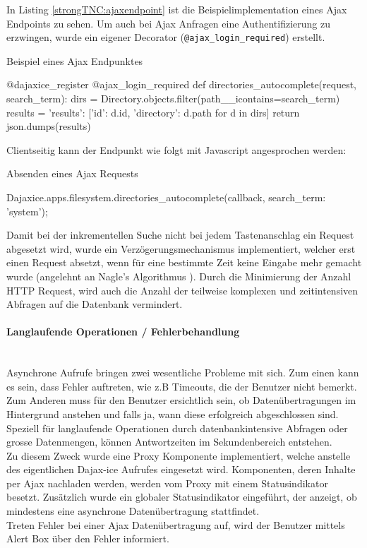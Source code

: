 In Listing \ref{strongTNC:ajaxendpoint} ist die Beispielimplementation eines Ajax Endpoints zu sehen. Um auch bei Ajax Anfragen eine Authentifizierung zu erzwingen, wurde ein eigener Decorator (\texttt{@ajax\_login\_required}) erstellt. 
\begin{listing}
\caption{Beispiel eines Ajax Endpunktes}
\label{strongTNC:ajaxendpoint}
\begin{pythoncode}
@dajaxice_register
@ajax_login_required
def directories_autocomplete(request, search_term):
    dirs = Directory.objects.filter(path__icontains=search_term)
    results = {'results': [{'id': d.id, 'directory': d.path} for d in dirs]}
    return json.dumps(results)
\end{pythoncode}
\end{listing}

Clientseitig kann der Endpunkt wie folgt mit Javascript angesprochen werden:
\begin{listing}
\caption{Absenden eines Ajax Requests}
\begin{jscode}
Dajaxice.apps.filesystem.directories_autocomplete(callback, {search_term: 'system'});
\end{jscode} 
\end{listing}

Damit bei der inkrementellen Suche nicht bei jedem Tastenanschlag ein Request
abgesetzt wird, wurde ein Verzögerungsmechanismus implementiert, welcher erst einen Request
absetzt, wenn für eine bestimmte Zeit keine Eingabe mehr gemacht wurde (angelehnt an Nagle's Algorithmus \cite{nagle1984congestion}).
Durch die Minimierung der Anzahl HTTP Request, wird auch die Anzahl der teilweise komplexen und zeitintensiven Abfragen auf die Datenbank vermindert.

\paragraph{Langlaufende Operationen / Fehlerbehandlung}\hspace{0pt}\\
Asynchrone Aufrufe bringen zwei wesentliche Probleme mit sich. Zum einen kann es
sein, dass Fehler auftreten, wie z.B Timeouts, die der Benutzer nicht bemerkt.
Zum Anderen muss für den Benutzer ersichtlich sein, ob Datenübertragungen im
Hintergrund anstehen und falls ja, wann diese erfolgreich abgeschlossen sind.
Speziell für langlaufende Operationen durch datenbankintensive Abfragen oder
grosse Datenmengen, können Antwortzeiten im Sekundenbereich entstehen. \\
Zu diesem Zweck wurde eine Proxy Komponente \cite{gamma1994design}
implementiert, welche anstelle des eigentlichen Dajax-ice Aufrufes eingesetzt
wird. Komponenten, deren Inhalte per Ajax nachladen werden, werden vom Proxy mit
einem Statusindikator besetzt. Zusätzlich wurde ein globaler Statusindikator
eingeführt, der anzeigt, ob mindestens eine asynchrone Datenübertragung
stattfindet.\\
Treten Fehler bei einer Ajax Datenübertragung auf, wird der Benutzer mittels
Alert Box über den Fehler informiert.

